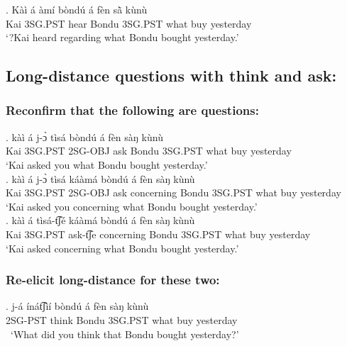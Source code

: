 \documentclass{assets/fieldnotes}
\begin{document}
\exg.  Kàì á àmí bòndú á fèn sã̀  kùnù\\
Kai 3SG.PST hear Bondu 3SG.PST what buy yesterday\\
`?Kai heard regarding what Bondu bought yesterday.' \\


\subsection{Long-distance questions with think and ask:}

\subsubsection{Reconfirm that the following are questions:}

\exg. kàì á j-ɔ̀ tìsá bòndú á fèn sàŋ kùnù\\
Kai 3SG.PST 2SG-OBJ ask Bondu 3SG.PST what buy yesterday\\
`Kai asked you what Bondu bought yesterday.' \\  


\exg. kàì á j-ɔ̀ tìsá káàmá bòndú á fèn sàŋ kùnù\\
Kai 3SG.PST 2SG-OBJ ask concerning Bondu 3SG.PST what buy yesterday\\
`Kai asked you concerning what Bondu bought yesterday.' \\

\exg. kàì á tìsá-t͡ʃé káàmá bòndú á fèn sàŋ kùnù\\
Kai 3SG.PST ask-t͡ʃe concerning Bondu 3SG.PST what buy yesterday\\
`Kai asked concerning what Bondu bought yesterday.' \\



\subsubsection{Re-elicit long-distance for these two:}

\exg. j-á ínát͡ʃìí bòndú á fèn sàŋ kùnù \\
2SG-PST think Bondu 3SG.PST what buy yesterday\\\
`What did you think that Bondu bought yesterday?' \\  
\end{document}
